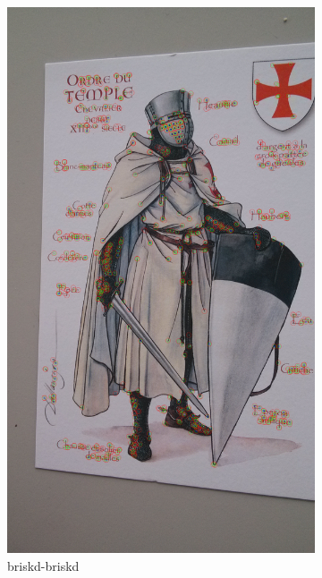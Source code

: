 \documentclass[10pt,conference,compsocconf]{IEEEtran}
\begin{document}
\begin{figure}[!ht]
        \centering
        \begin{subfigure}[b]{0.15\textwidth}
                \includegraphics[width=\textwidth]{b}
                \caption{briskd-briskd}
                \label{fig:b}
        \end{subfigure}%
        ~ %
        \begin{subfigure}[b]{0.15\textwidth}

\end{subfigure}
\end{figure}
\end{document}
